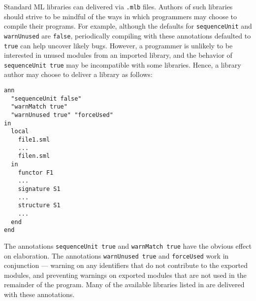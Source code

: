 Standard ML libraries can delivered via {\tt .mlb} files.  Authors of
such libraries should strive to be mindful of the ways in which
programmers may choose to compile their programs.  For example,
although the defaults for {\tt sequenceUnit} and {\tt warnUnused} are
{\tt false}, periodically compiling with these annotations defaulted
to {\tt true} can help uncover likely bugs.  However, a programmer is
unlikely to be interested in unused modules from an imported library,
and the behavior of {\tt sequenceUnit true} may be incompatible with
some libraries.  Hence, a library author may choose to deliver a
library as follows:
\begin{verbatim}
ann 
  "sequenceUnit false"
  "warnMatch true"
  "warnUnused true" "forceUsed"
in
  local
    file1.sml
    ...
    filen.sml
  in
    functor F1
    ...
    signature S1
    ...
    structure S1
    ...
  end
end
\end{verbatim}
The annotations {\tt sequenceUnit true} and {\tt warnMatch true} have
the obvious effect on elaboration.  The annotations {\tt warnUnused
true} and {\tt forceUsed} work in conjunction --- warning on any
identifiers that do not contribute to the exported modules, and
preventing warnings on exported modules that are not used in the
remainder of the program.  Many of the available libraries listed in
 are delivered with these annotations.
